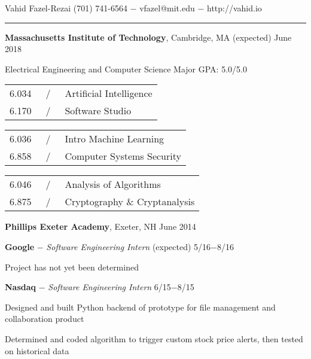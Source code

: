 \documentclass[11pt]{article}
\newcommand{\msection}[1]{\vspace{1em}\marginnote{#1}} %
\newcommand{\bt}[1]{\textbf{#1}} %
\newcommand{\gap}[0]{\vspace{0.6em}} %
\newcommand{\dash}[0]{ $-$ } %
\newcommand{\tabsep}[0]{\, / \,} %
\begin{document}

{\Huge Vahid Fazel-Rezai} \hfill  (701) 741-6564\dash vfazel@mit.edu\dash http://vahid.io

\vspace{0.4em}

\hspace{-1.2in}\rule{7.9in}{0.2em}

\vspace{-0.2em}



\msection{Education}

\bt{Massachusetts Institute of Technology}, Cambridge, MA \hfill (expected) June 2018

Electrical Engineering and Computer Science \hfill Major GPA: 5.0/5.0

\vspace{0.15em}\begin{tabular}{rcl}
6.034 & \tabsep & Artificial Intelligence \\
6.170 & \tabsep & Software Studio
\end{tabular}
\hfill
\begin{tabular}{rcl}
6.036 & \tabsep & Intro Machine Learning \\
6.858 & \tabsep & Computer Systems Security
\end{tabular}
\hfill
\begin{tabular}{rcl}
6.046 & \tabsep & Analysis of Algorithms \\
6.875 & \tabsep & Cryptography \& Cryptanalysis
\end{tabular}

\gap

\bt{Phillips Exeter Academy}, Exeter, NH \hfill June 2014



\msection{Work}

\bt{Google}\dash \emph{Software Engineering Intern} \hfill (expected) 5/16$-$8/16

Project has not yet been determined

\gap

\bt{Nasdaq}\dash \emph{Software Engineering Intern} \hfill 6/15$-$8/15

Designed and built Python backend of prototype for file management and collaboration product

Determined and coded algorithm to trigger custom stock price alerts, then tested on historical data

\gap
\end{document}
